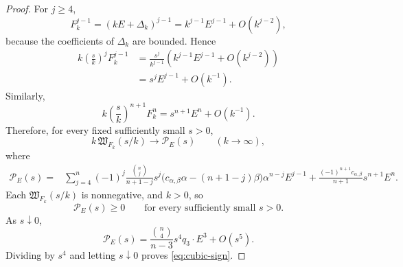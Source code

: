 \documentclass[reqno]{amsart}
\newcommand{\cab}{c_{\alpha,\beta}}
\theoremstyle{plain}
\theoremstyle{remark}
\begin{document}
\begin{proof}
For $j\geq4$,
\[
F_k^{j-1}
=(kE+\Delta_k)^{j-1}
=k^{j-1}E^{j-1}+O(k^{j-2}),
\]
because the coefficients of $\Delta_k$ are bounded. Hence
\[
\begin{aligned}
k\left(\frac{s}{k}\right)^jF_k^{j-1}
&=\frac{s^j}{k^{j-1}}
 \left(k^{j-1}E^{j-1}+O(k^{j-2})\right)\\
&=s^jE^{j-1}+O(k^{-1}).
\end{aligned}
\]
Similarly,
\[
k\left(\frac{s}{k}\right)^{n+1}F_k^n
=s^{n+1}E^n+O(k^{-1}).
\]
Therefore, for every fixed sufficiently small $s>0$,
\[
k\,\mathfrak W_{F_k}(s/k)\longrightarrow\mathcal P_E(s)
\qquad(k\to\infty),
\]
where
\[
\begin{aligned}
\mathcal P_E(s)
={}&\sum_{j=4}^{n}(-1)^j
\frac{\binom nj}{n+1-j}s^j
\bigl(\cab\alpha-(n+1-j)\beta\bigr)
\alpha^{n-j}E^{j-1}
+\frac{(-1)^{n+1}\cab}{n+1}s^{n+1}E^n.
\end{aligned}
\]
Each $\mathfrak W_{F_k}(s/k)$ is nonnegative, and $k>0$, so
\[
\mathcal P_E(s)\geq0 \qquad \text{for every sufficiently small }s>0.
\]
As $s\downarrow0$,
\[
 \mathcal P_E(s)
 =\frac{\binom{n}{4}}{n-3}s^4q_3\cdot E^3+O(s^5).
\]
Dividing by $s^4$ and letting $s\downarrow0$ proves
\eqref{eq:cubic-sign}.

\end{proof}
\end{document}
